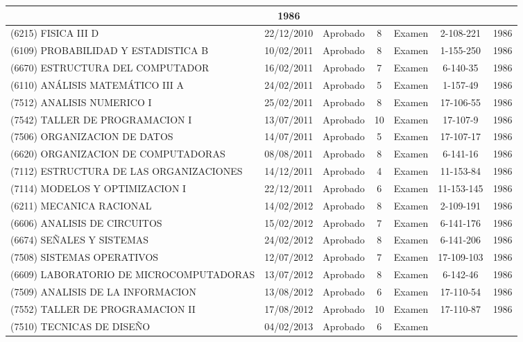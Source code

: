 \documentclass[a4paper,10pt]{article}
\begin{document}
\begin{center}
\begin{longtable}{|p{3.5cm}|c|c|c|p{1.4cm}|c|c|}
			& 1986 \\
			\hline
			(6215) FISICA III D & 22/12/2010 & Aprobado & 8 & Examen & 2-108-221
			& 1986 \\
			\hline
			(6109) PROBABILIDAD Y ESTADISTICA B & 10/02/2011 & Aprobado & 8 & 
			Examen & 1-155-250 & 1986 \\
			\hline
			(6670) ESTRUCTURA DEL COMPUTADOR & 16/02/2011 & Aprobado & 7 & 
			Examen & 6-140-35 & 1986 \\
			\hline
			(6110) ANÁLISIS MATEMÁTICO III A & 24/02/2011 & Aprobado & 5 & 
			Examen & 1-157-49 & 1986 \\
			\hline
			(7512) ANALISIS NUMERICO I & 25/02/2011 & Aprobado & 8 & Examen & 
			17-106-55 & 1986 \\
			\hline
			(7542) TALLER DE PROGRAMACION I & 13/07/2011 & Aprobado & 10 & 
			Examen & 17-107-9 & 1986 \\
			\hline
			(7506) ORGANIZACION DE DATOS & 14/07/2011 & Aprobado & 5 & Examen & 
			17-107-17 & 1986 \\
			\hline
			(6620) ORGANIZACION DE COMPUTADORAS & 08/08/2011 & Aprobado & 8 & 
			Examen & 6-141-16 & 1986 \\
			\hline
			(7112) ESTRUCTURA DE LAS ORGANIZACIONES & 14/12/2011 & Aprobado & 4 
			& Examen & 11-153-84 & 1986 \\
			\hline
			(7114) MODELOS Y OPTIMIZACION I & 22/12/2011 & Aprobado & 6 & Examen
			& 11-153-145 & 1986 \\
			\hline
			(6211) MECANICA RACIONAL & 14/02/2012 & Aprobado & 8 & Examen & 
			2-109-191 & 1986 \\
			\hline
			(6606) ANALISIS DE CIRCUITOS & 15/02/2012 & Aprobado & 7 & Examen &
			6-141-176 & 1986 \\
			\hline
			(6674) SEÑALES Y SISTEMAS & 24/02/2012 & Aprobado & 8 & Examen & 
			6-141-206 & 1986 \\
			\hline
			(7508) SISTEMAS OPERATIVOS & 12/07/2012 & Aprobado & 7 & Examen & 
			17-109-103 & 1986 \\
			\hline
			(6609) LABORATORIO DE MICROCOMPUTADORAS & 13/07/2012 & Aprobado & 8
			& Examen & 6-142-46 & 1986 \\
			\hline
			(7509) ANALISIS DE LA INFORMACION & 13/08/2012 & Aprobado & 6 & 
			Examen & 17-110-54 & 1986 \\
			\hline
			(7552) TALLER DE PROGRAMACION II & 17/08/2012 & Aprobado & 10 & 
			Examen & 17-110-87 & 1986 \\
			\hline
			(7510) TECNICAS DE DISEÑO & 04/02/2013 & Aprobado & 6 & Examen & 

\end{longtable}
\end{center}
\end{document}
